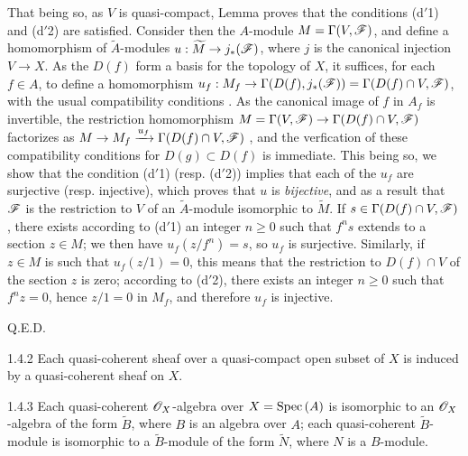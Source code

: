 That being so, as $V$ is quasi-compact, Lemma  proves that the
conditions (d$'$1) and (d$'$2) are satisfied. Consider then the $A$-module
$M=\Gamma(V,\mathscr{F})$, and define a homomorphism of $\widetilde{A}$-modules
$u:\widetilde{M}\to j_*(\mathscr{F})$, where $j$ is the canonical injection $V\to X$. As the
$D(f)$ form a basis for the topology of $X$, it suffices, for each $f\in A$, to define a
homomorphism $u_f:M_f\to\Gamma(D(f),j_*(\mathscr{F}))=\Gamma(D(f)\cap V,\mathscr{F})$, with the usual
compatibility conditions . As the canonical image of $f$ in $A_f$ is
invertible, the restriction homomorphism $M=\Gamma(V,\mathscr{F})\to\Gamma(D(f)\cap V,\mathscr{F})$
factorizes as $M\to M_f\xrightarrow{u_f}\Gamma(D(f)\cap V,\mathscr{F})$ , and the
verfication of these compatibility conditions for $D(g)\subset D(f)$ is immediate. This being
so, we show that the condition (d$'$1) (resp. (d$'$2)) implies that each of the $u_f$ are
surjective (resp. injective), which proves that $u$ is \emph{bijective}, and as a result that
$\mathscr{F}$ is the restriction to $V$ of an $\widetilde{A}$-module isomorphic to
$\widetilde{M}$. If $s\in\Gamma(D(f)\cap V,\mathscr{F})$, there exists according to (d$'$1) an
integer $n\geqslant 0$ such that $f^n s$ extends to a section $z\in M$; we then have
$u_f(z/f^n)=s$, so $u_f$ is surjective. Similarly, if $z\in M$ is such that $u_f(z/1)=0$,
this means that the restriction to $D(f)\cap V$ of the section $z$ is zero; according to
(d$'$2), there exists an integer $n\geqslant 0$ such that $f^n z=0$, hence $z/1=0$ in $M_f$,
and therefore $u_f$ is injective.
\begin{flushright}
Q.E.D.
\end{flushright}

\begin{envs}[Corollary]{1.4.2}
\label{cor-1.1.4.2}
Each quasi-coherent sheaf over a quasi-compact open subset of $X$ is induced by a
quasi-coherent sheaf on $X$.
\end{envs}

\begin{envs}[Corollary]{1.4.3}
\label{cor-1.1.4.3}
Each quasi-coherent $\mathscr{O}_X$-algebra over $X={\mathop{\mathrm{Spec}}\nolimits}\,(A)$ is isomorphic to an $\mathscr{O}_X$-algebra of
the form $\widetilde{B}$, where $B$ is an algebra over $A$; each quasi-coherent
$\widetilde{B}$-module is isomorphic to a $\widetilde{B}$-module of the form $\widetilde{N}$,
where $N$ is a $B$-module.
\end{envs}

